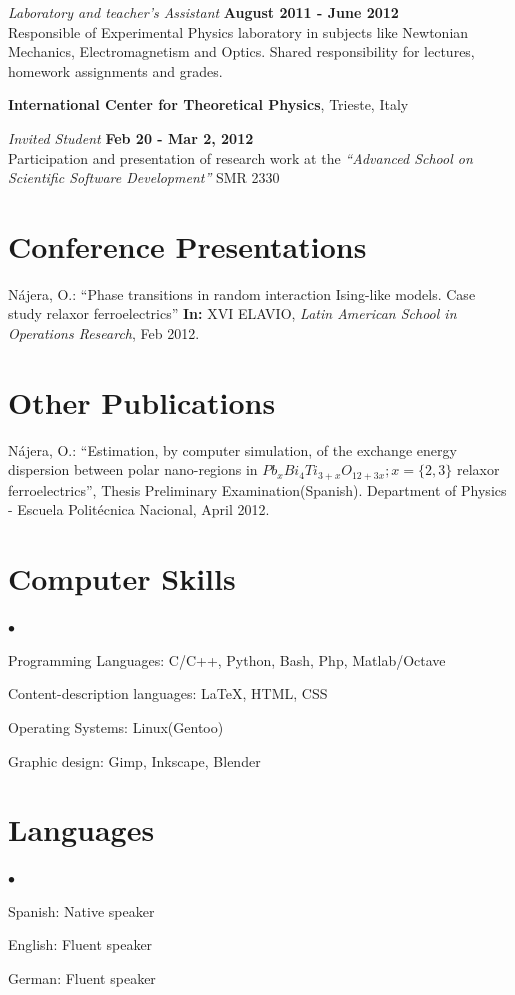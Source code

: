 \documentclass[margin,line]{res}
\newenvironment{list2}{
  \begin{list}{$\bullet$}{%
      \setlength{\itemsep}{0in}
      \setlength{\parsep}{0in} \setlength{\parskip}{0in}
      \setlength{\topsep}{0in} \setlength{\partopsep}{0in} 
      \setlength{\leftmargin}{0.2in}}}{\end{list}}
\begin{document}
\begin{resume}
  {\em Laboratory and teacher's Assistant} \hfill {\bf August 2011 - June 2012}\\
  Responsible of Experimental Physics laboratory in subjects
  like Newtonian Mechanics, Electromagnetism and Optics.
  Shared responsibility for lectures, homework assignments and grades.

  {\bf International Center for Theoretical Physics}, Trieste, Italy

  \vspace{-.3cm}
  {\em Invited Student} \hfill {\bf Feb 20 - Mar 2, 2012} \\
  Participation and presentation of research work at the {\em ``Advanced School on Scientific
  Software Development''} SMR 2330

\section{\sc Conference Presentations}
  Nájera, O.: ``Phase transitions in random interaction Ising-like models. Case study relaxor
  ferroelectrics'' {\bf In:} XVI ELAVIO, {\em Latin American School in Operations Research}, Feb 2012.

\section{\sc Other Publications}
  Nájera, O.: ``Estimation, by computer simulation, of the exchange energy dispersion between
  polar nano-regions in $Pb_xBi_4Ti_{3+x}O_{12+3x}; x=\{2,3\}$ relaxor ferroelectrics'', Thesis
  Preliminary Examination(Spanish). Department of Physics - Escuela Politécnica Nacional, April 2012.


\section{\sc Computer Skills}
  \begin{list2}
    \item Programming Languages:  C/C++, Python, Bash, Php, Matlab/Octave
    \item Content-description languages: \LaTeX, HTML, CSS
    \item Operating Systems:  Linux(Gentoo)
    \item Graphic design: Gimp, Inkscape, Blender
  \end{list2}

\section{\sc Languages}
  \begin{list2}
    \item Spanish: Native speaker
    \item English: Fluent speaker
    \item German: Fluent speaker
  \end{list2}
  

\end{resume}
\end{document}
